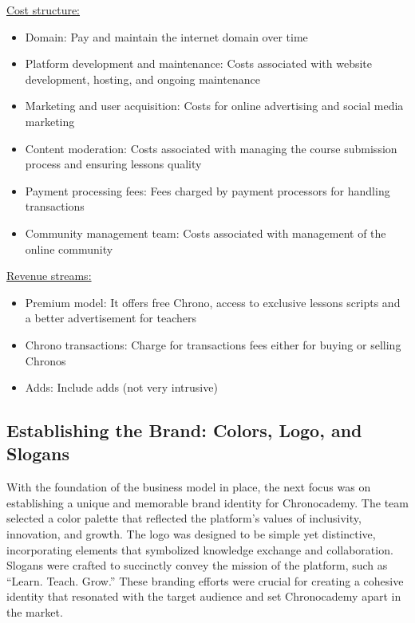 \underline{Cost structure:}
\begin{itemize}
\item Domain: Pay and maintain the internet domain over time
\item Platform development and maintenance: Costs associated with website development, hosting, and ongoing maintenance
\item Marketing and user acquisition: Costs for online advertising and social media marketing
\item Content moderation: Costs associated with managing the course submission process and ensuring lessons quality
\item Payment processing fees: Fees charged by payment processors for handling transactions
\item Community management team: Costs associated with management of the online community
\end{itemize}

\underline{Revenue streams:}
\begin{itemize}
\item Premium model: It offers free Chrono, access to exclusive lessons scripts and a better advertisement for teachers
\item Chrono transactions: Charge for transactions fees either for buying or selling Chronos
\item Adds: Include adds (not very intrusive)
\end{itemize}


\subsection{Establishing the Brand: Colors, Logo, and Slogans}\label{subsec:establishing-the-brand:-colors-logo-and-slogans}
With the foundation of the business model in place, the next focus was on establishing a unique and memorable brand identity for Chronocademy.
The team selected a color palette that reflected the platform’s values of inclusivity, innovation, and growth.
The logo was designed to be simple yet distinctive, incorporating elements that symbolized knowledge exchange and collaboration.
Slogans were crafted to succinctly convey the mission of the platform, such as ``Learn.
Teach.
Grow.'' These branding efforts were crucial for creating a cohesive identity that resonated with the target audience and set Chronocademy apart in the market.


